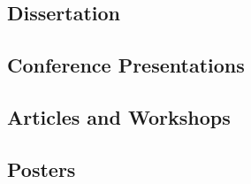 \documentclass[margin,line]{res}
\let\resumesection\section
\begin{document}
\begin{resume}
\subsection{\sc Dissertation}

\renewcommand{\section}[2]{}
\renewcommand{\section}{\resumesection}


\subsection{\sc Conference Presentations}

\renewcommand{\section}[2]{}
\renewcommand{\section}{\resumesection}


\subsection{\sc Articles and Workshops}

\renewcommand{\section}[2]{}
\renewcommand{\section}{\resumesection}


\subsection{\sc Posters}


\end{resume}
\end{document}
